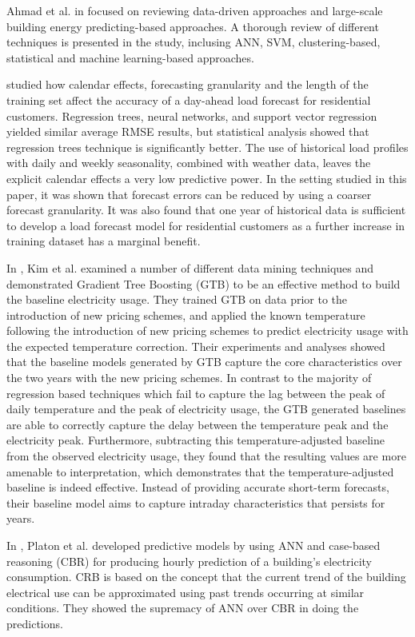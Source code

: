 Ahmad et al. in \cite{AHMAD2018301} focused on reviewing data-driven approaches and large-scale building energy predicting-based approaches.
A thorough review of different techniques is presented in the study, inclusing ANN, SVM, clustering-based, statistical and machine learning-based approaches.

\cite{LUSIS2017654} studied how calendar effects, forecasting granularity and the length of the training set affect the accuracy of a day-ahead load forecast for residential customers.
Regression trees, neural networks, and support vector regression yielded similar average RMSE results, but statistical analysis showed that regression trees technique is significantly better.
The use of historical load profiles with daily and weekly seasonality, combined with weather data, leaves the explicit calendar effects a very low predictive power.
In the setting studied in this paper, it was shown that forecast errors can be reduced by using a coarser forecast granularity.
It was also found that one year of historical data is sufficient to develop a load forecast model for residential customers as a further increase in training dataset has a marginal benefit.

In \cite{7463810}, Kim et al. examined a number of different data mining techniques and demonstrated Gradient Tree Boosting (GTB) to be an effective method to build the baseline electricity usage.
They trained GTB on data prior to the introduction of new pricing schemes, and applied the known temperature following the introduction of new pricing schemes to predict electricity usage with the expected temperature correction.
Their experiments and analyses showed that the baseline models generated by GTB capture the core characteristics over the two years with the new pricing schemes.
In contrast to the majority of regression based techniques which fail to capture the lag between the peak of daily temperature and the peak of electricity usage, the GTB generated baselines are able to correctly capture the delay between the temperature peak and the electricity peak.
Furthermore, subtracting this temperature-adjusted baseline from the observed electricity usage, they found that the resulting values are more amenable to interpretation, which demonstrates that the temperature-adjusted baseline is indeed effective.
Instead of providing accurate short-term forecasts, their baseline model aims to capture intraday characteristics that persists for years.

In \cite{PLATON201510}, Platon et al. developed predictive models by using ANN and case-based reasoning (CBR) for producing hourly prediction of a building’s electricity consumption.
CRB is based on the concept that the current trend of the building electrical use can be approximated using past trends occurring at similar conditions.
They showed the supremacy of ANN over CBR in doing the predictions.

